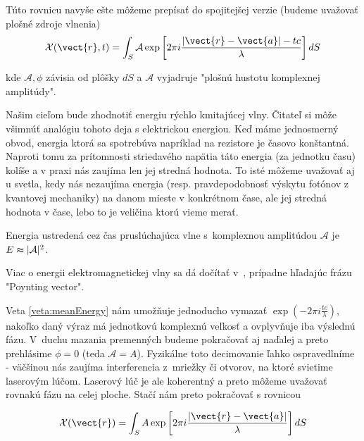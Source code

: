 Túto rovnicu navyše ešte môžeme prepísať do spojitejšej verzie (budeme
uvažovať plošné zdroje vlnenia)
\begin{equation}
\mathcal{X}(\vect{r},t)=\int_S
 \mathcal{A} \exp \left[2 \pi i \frac{|\vect{r}-\vect{a}|
 -tc}{\lambda} \right] dS
\end{equation}

kde $\mathcal{A}, \phi$ závisia od plôšky $dS$ a $\mathcal{A}$
vyjadruje "plošnú hustotu komplexnej amplitúdy".

\begin{poznamka}
 Našim cieľom bude zhodnotiť energiu rýchlo kmitajúcej vlny.
 Čitateľ si môže všimnúť analógiu tohoto deja s elektrickou
 energiou. Keď máme jednosmerný obvod, energia ktorá sa spotrebúva
 napríklad na rezistore je časovo konštantná. Naproti tomu za
 prítomnosti striedavého napätia táto energia (za jednotku času) kolíše
 a v praxi nás zaujíma len jej stredná hodnota. To isté môžeme
 uvažovať aj u svetla, kedy nás nezaujíma energia (resp.
 pravdepodobnosť výskytu fotónov z kvantovej mechaniky) 
 na danom mieste v konkrétnom čase,
 ale jej stredná hodnota v čase, lebo to je veličina ktorú vieme merať.
\end{poznamka}


\begin{veta}
Energia ustredená cez čas pruslúchajúca vlne s~komplexnou amplitúdou 
$\mathcal{A}$ je $E \thickapprox |\mathcal{A}|^2$.
\label{veta:meanEnergy}
\end{veta}

\begin{poznamka}
 Viac o energii elektromagnetickej vlny sa dá dočítať 
 v~\cite[str. 90-92]{eldyn}, prípadne hľadajúc frázu "Poynting vector".
\end{poznamka}

Veta \ref{veta:meanEnergy} nám umožňuje jednoducho vymazať
$\exp\left(-2 \pi i \frac{tc}{\lambda}\right)$, nakoľko daný výraz má
jednotkovú komplexnú veľkosť a ovplyvňuje iba výslednú fázu.
V~duchu mazania premenných budeme pokračovať aj
naďalej a preto prehlásime $\phi=0$ (teda $\mathcal{A}=A$).
Fyzikálne toto decimovanie
ľahko ospravedlníme - väčšinou nás zaujíma interferencia
z~mriežky či otvorov, na ktoré svietime laserovým lúčom. Laserový
lúč je ale koherentný a preto môžeme uvažovať rovnakú fázu na celej
ploche. Stačí nám preto pokračovať s rovnicou

\begin{equation}
\mathcal{X}(\vect{r})=\int_S
 A \exp \left[2 \pi i \frac{|\vect{r}-\vect{a}|}{\lambda} \right] dS
\end{equation}

